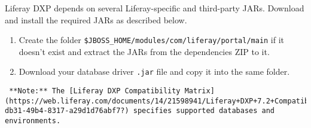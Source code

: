 Liferay DXP depends on several Liferay-specific and third-party JARs.
Download and install the required JARs as described below.

\begin{enumerate}
\def\labelenumi{\arabic{enumi}.}
\item
  Create the folder
  \texttt{\$JBOSS\_HOME/modules/com/liferay/portal/main} if it doesn't
  exist and extract the JARs from the dependencies ZIP to it.
\item
  Download your database driver \texttt{.jar} file and copy it into the
  same folder.
\end{enumerate}

\noindent\hrulefill

\begin{verbatim}
 **Note:** The [Liferay DXP Compatibility Matrix](https://web.liferay.com/documents/14/21598941/Liferay+DXP+7.2+Compatibility+Matrix/b6e0f064-db31-49b4-8317-a29d1d76abf7?) specifies supported databases and environments.
\end{verbatim}

\noindent\hrulefill

